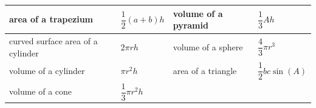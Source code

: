 \documentclass[10pt,twoside]{article}
\begin{document}
{\qfont\fontsize{11}{13}\selectfont\renewcommand{\arraystretch}{1.9}%
\begin{tabular}{|>{\raggedright\arraybackslash}p{30mm}|>{\centering\arraybackslash}p{40mm}|>{\raggedright\arraybackslash}p{30mm}|>{\centering\arraybackslash}p{52mm}|}
  \hline
  area of a trapezium & $\dfrac{1}{2}(a+b)h$ & volume of a pyramid & $\dfrac{1}{3}Ah$ \\ \hline
  curved surface area of a cylinder & $2\pi rh$ & volume of a sphere & $\dfrac{4}{3}\pi r^{3}$ \\ \hline
  volume of a cylinder & $\pi r^{2}h$ & area of a triangle & $\dfrac{1}{2}bc\sin(A)$ \\ \hline
  volume of a cone & $\dfrac{1}{3}\pi r^{2}h$ &
    \multicolumn{2}{l|}{\cellcolor{cellgrey}} \\ \hline
\end{tabular}}
\end{document}

